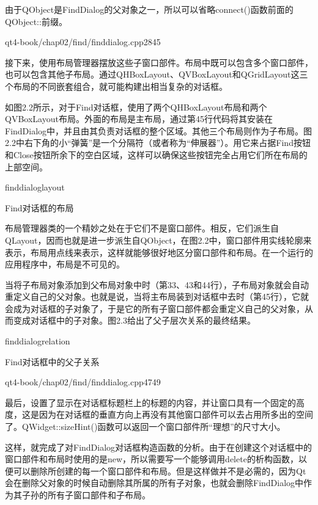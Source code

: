 \documentclass[11pt,oneside]{book}
\begin{document}
\begin{common-format}
由于QObject是FindDialog的父对象之一，所以可以省略connect()函数前面的QObject::前缀。

\begin{cppline}{qt4-book/chap02/find/finddialog.cpp}{28}{45}
\end{cppline}

接下来，使用布局管理器摆放这些子窗口部件。布局中既可以包含多个窗口部件，也可以包含其他子布局。通过QHBoxLayout、QVBoxLayout和QGridLayout这三个布局的不同嵌套组合，就可能构建出相当复杂的对话框。

如图2.2所示，对于Find对话框，使用了两个QHBoxLayout布局和两个QVBoxLayout布局。外面的布局是主布局，通过第45行代码将其安装在FindDialog中，并且由其负责对话框的整个区域。其他三个布局则作为子布局。图2.2中右下角的小“弹簧”是一个分隔符（或者称为“伸展器”）。用它来占据Find按钮和Close按钮所余下的空白区域，这样可以确保这些按钮完全占用它们所在布局的上部空间。

\begin{linefig}[0.8]{finddialoglayout}
\caption{Find对话框的布局}
\label{fig:finddialoglayout}
\end{linefig}

布局管理器类的一个精妙之处在于它们不是窗口部件。相反，它们派生自QLayout，因而也就是进一步派生自QObject，在图2.2中，窗口部件用实线轮廓来表示，布局用点线来表示，这样就能够很好地区分窗口部件和布局。在一个运行的应用程序中，布局是不可见的。

当将子布局对象添加到父布局对象中时（第33、43和44行），子布局对象就会自动重定义自己的父对象。也就是说，当将主布局装到对话框中去时（第45行），它就会成为对话框的子对象了，于是它的所有子窗口部件都会重定义自己的父对象，从而变成对话框中的子对象。图2.3给出了父子层次关系的最终结果。

\begin{fig}[0.8]{finddialogrelation}
\caption{Find对话框中的父子关系}
\label{fig:finddialogrelation}
\end{fig}

\begin{cppline}{qt4-book/chap02/find/finddialog.cpp}{47}{49}
\end{cppline}

最后，设置了显示在对话框标题栏上的标题的内容，并让窗口具有一个固定的高度，这是因为在对话框的垂直方向上再没有其他窗口部件可以去占用所多出的空间了。QWidget::sizeHint()函数可以返回一个窗口部件所“理想”的尺寸大小。

这样，就完成了对FindDialog对话框构造函数的分析。由于在创建这个对话框中的窗口部件和布局时使用的是new，所以需要写一个能够调用delete的析构函数，以便可以删除所创建的每一个窗口部件和布局。但是这样做并不是必需的，因为Qt会在删除父对象的时候自动删除其所属的所有子对象，也就会删除FindDialog中作为其子孙的所有子窗口部件和子布局。


\end{common-format}
\end{document}
